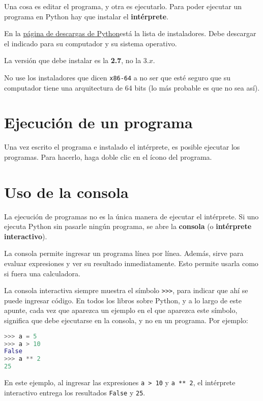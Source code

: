 Una cosa es editar el programa, y otra es ejecutarlo. Para poder
ejecutar un programa en Python hay que instalar el \textbf{intérprete}.

En la \href{http://www.python.org/download/}{página de descargas de
Python}\footnotemark está la lista de instaladores. Debe descargar el indicado para
su computador y su sistema operativo.


La versión que debe instalar es la \textbf{2.7}, no la 3.\(x\).

No use los instaladores que dicen \lstinline!x86-64! a no ser que esté
seguro que su computador tiene una arquitectura de 64 bits (lo más
probable es que no sea así).

\section{Ejecución de un programa}

Una vez escrito el programa e instalado el intérprete, es posible
ejecutar los programas. Para hacerlo, haga doble clic en el ícono del
programa.

\section{Uso de la consola}

La ejecución de programas no es la única manera de ejecutar el
intérprete. Si uno ejecuta Python sin pasarle ningún programa, se abre
la \textbf{consola} (o \textbf{intérprete interactivo}).

La consola permite ingresar un programa línea por línea. Además, sirve
para evaluar expresiones y ver su resultado inmediatamente. Esto permite
usarla como si fuera una calculadora.

La consola interactiva siempre muestra el símbolo \lstinline!>>>!, para
indicar que ahí se puede ingresar código. En todos los libros sobre
Python, y a lo largo de este apunte, cada vez que aparezca un ejemplo en
el que aparezca este símbolo, significa que debe ejecutarse en la
consola, y no en un programa. Por ejemplo:

\begin{lstlisting}[language=py]
>>> a = 5
>>> a > 10
False
>>> a ** 2
25
\end{lstlisting}

En este ejemplo, al ingresar las expresiones \lstinline!a > 10! y
\lstinline!a ** 2!, el intérprete interactivo entrega los resultados
\lstinline!False! y \lstinline!25!.

